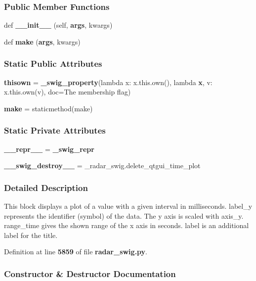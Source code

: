 \subsubsection*{Public Member Functions}
\begin{DoxyCompactItemize}
\item 
def {\bf \+\_\+\+\_\+init\+\_\+\+\_\+} (self, {\bf args}, kwargs)
\item 
def {\bf make} ({\bf args}, kwargs)
\end{DoxyCompactItemize}
\subsubsection*{Static Public Attributes}
\begin{DoxyCompactItemize}
\item 
{\bf thisown} = {\bf \+\_\+swig\+\_\+property}(lambda x\+: x.\+this.\+own(), lambda {\bf x}, v\+: x.\+this.\+own(v), doc=\textquotesingle{}The membership flag\textquotesingle{})
\item 
{\bf make} = staticmethod(make)
\end{DoxyCompactItemize}
\subsubsection*{Static Private Attributes}
\begin{DoxyCompactItemize}
\item 
{\bf \+\_\+\+\_\+repr\+\_\+\+\_\+} = {\bf \+\_\+swig\+\_\+repr}
\item 
{\bf \+\_\+\+\_\+swig\+\_\+destroy\+\_\+\+\_\+} = \+\_\+radar\+\_\+swig.\+delete\+\_\+qtgui\+\_\+time\+\_\+plot
\end{DoxyCompactItemize}


\subsubsection{Detailed Description}
\begin{DoxyVerb}This block displays a plot of a value with a given interval in milliseconds. label_y represents the identifier (symbol) of the data. The y axis is scaled with axis_y. range_time gives the shown range of the x axis in seconds. label is an additional label for the title.\end{DoxyVerb}
 

Definition at line {\bf 5859} of file {\bf radar\+\_\+swig.\+py}.



\subsubsection{Constructor \& Destructor Documentation}
